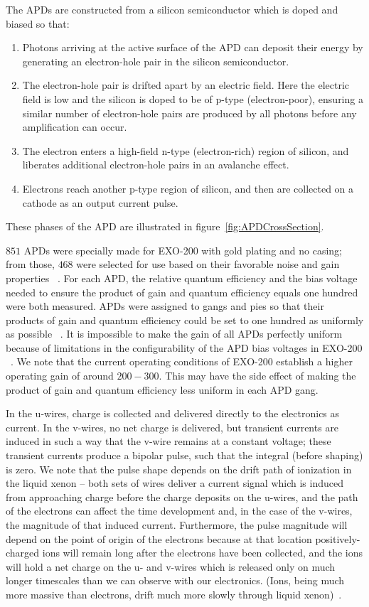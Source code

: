 The APDs are constructed from a silicon semiconductor which is doped and biased so that:~\cite{Moszynski2002504}
\begin{enumerate}
\item Photons arriving at the active surface of the APD can deposit their energy by generating an electron-hole pair in the silicon semiconductor.
\item The electron-hole pair is drifted apart by an electric field.  Here the electric field is low and the silicon is doped to be of p-type (electron-poor), ensuring a similar number of electron-hole pairs are produced by all photons before any amplification can occur.
\item The electron enters a high-field n-type (electron-rich) region of silicon, and liberates additional electron-hole pairs in an avalanche effect.
\item Electrons reach another p-type region of silicon, and then are collected on a cathode as an output current pulse.
\end{enumerate}
These phases of the APD are illustrated in figure~\ref{fig:APDCrossSection}.

$851$ APDs were specially made for EXO-200 with gold plating and no casing; from those, $468$ were selected for use based on their favorable noise and gain properties ~\cite{EXOLAAPD}.  For each APD, the relative quantum efficiency and the bias voltage needed to ensure the product of gain and quantum efficiency equals one hundred were both measured.  APDs were assigned to gangs and pies so that their products of gain and quantum efficiency could be set to one hundred as uniformly as possible ~\cite{APDMeasurementAndGanging}.  It is impossible to make the gain of all APDs perfectly uniform because of limitations in the configurability of the APD bias voltages in EXO-200 ~\cite{detectorPartI}.  We note that the current operating conditions of EXO-200 establish a higher operating gain of around $200-300$. This may have the side effect of making the product of gain and quantum efficiency less uniform in each APD gang.

In the u-wires, charge is collected and delivered directly to the electronics as current.  In the v-wires, no net charge is delivered, but transient currents are induced in such a way that the v-wire remains at a constant voltage; these transient currents produce a bipolar pulse, such that the integral (before shaping) is zero.  We note that the pulse shape depends on the drift path of ionization in the liquid xenon -- both sets of wires deliver a current signal which is induced from approaching charge before the charge deposits on the u-wires, and the path of the electrons can affect the time development and, in the case of the v-wires, the magnitude of that induced current.  Furthermore, the pulse magnitude will depend on the point of origin of the electrons because at that location positively-charged ions will remain long after the electrons have been collected, and the ions will hold a net charge on the u- and v-wires which is released only on much longer timescales than we can observe with our electronics.  (Ions, being much more massive than electrons, drift much more slowly through liquid xenon)~\cite{EnergyDocumentRun2a,MCDocumentRun2a}.

